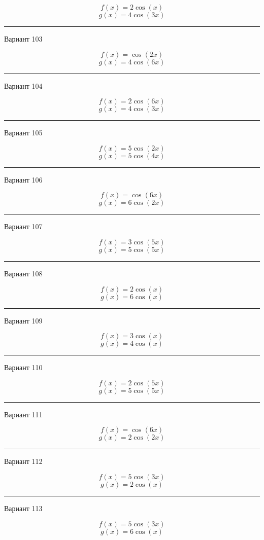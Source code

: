 \documentclass[11pt]{report}
\begin{document}
$$f(x)=2 \cos{\left(x \right)}$$
$$g(x)=4 \cos{\left(3 x \right)}$$

\rule{\textwidth}{.2mm}

Вариант 103

$$f(x)=\cos{\left(2 x \right)}$$
$$g(x)=4 \cos{\left(6 x \right)}$$

\rule{\textwidth}{.2mm}

Вариант 104

$$f(x)=2 \cos{\left(6 x \right)}$$
$$g(x)=4 \cos{\left(3 x \right)}$$

\rule{\textwidth}{.2mm}

Вариант 105

$$f(x)=5 \cos{\left(2 x \right)}$$
$$g(x)=5 \cos{\left(4 x \right)}$$

\rule{\textwidth}{.2mm}

Вариант 106

$$f(x)=\cos{\left(6 x \right)}$$
$$g(x)=6 \cos{\left(2 x \right)}$$

\rule{\textwidth}{.2mm}

Вариант 107

$$f(x)=3 \cos{\left(5 x \right)}$$
$$g(x)=5 \cos{\left(5 x \right)}$$

\rule{\textwidth}{.2mm}

Вариант 108

$$f(x)=2 \cos{\left(x \right)}$$
$$g(x)=6 \cos{\left(x \right)}$$

\rule{\textwidth}{.2mm}

Вариант 109

$$f(x)=3 \cos{\left(x \right)}$$
$$g(x)=4 \cos{\left(x \right)}$$

\rule{\textwidth}{.2mm}

Вариант 110

$$f(x)=2 \cos{\left(5 x \right)}$$
$$g(x)=5 \cos{\left(5 x \right)}$$

\rule{\textwidth}{.2mm}

Вариант 111

$$f(x)=\cos{\left(6 x \right)}$$
$$g(x)=2 \cos{\left(2 x \right)}$$

\rule{\textwidth}{.2mm}

Вариант 112

$$f(x)=5 \cos{\left(3 x \right)}$$
$$g(x)=2 \cos{\left(x \right)}$$

\rule{\textwidth}{.2mm}

Вариант 113

$$f(x)=5 \cos{\left(3 x \right)}$$
$$g(x)=6 \cos{\left(x \right)}$$
\end{document}
